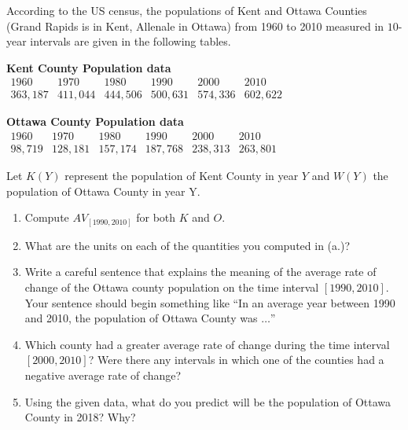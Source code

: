 \documentclass[nooutcomes]{ximera}
\begin{document}
\begin{exploration}
According to the US census, the populations of Kent and Ottawa Counties (Grand Rapids is in Kent, Allenale in Ottawa) from 1960 to 2010 measured in $10$-year intervals are given in the following tables.

\begin{center}

\textbf{Kent County Population data}
$
\begin{array}{llllll}
1960&1970&1980&1990&2000&2010\\
\hline
363,187&411,044&444,506&500,631&574,336&602,622
\end{array}
$

\vspace{.2in}

\textbf{Ottawa County Population data}
$
\begin{array}{llllll}
1960&1970&1980&1990&2000&2010\\
\hline
98,719&128,181&157,174&187,768&238,313&263,801
\end{array}
$
\end{center}

Let $K(Y)$ represent the population of Kent County in year $Y$ and $W(Y)$ the population of Ottawa County in year Y.
\begin{enumerate}[label=\alph*.]
\item Compute $AV_{[1990,2010]}$ for both $K$ and $O$.
\item What are the units on each of the quantities you computed in (a.)?
\item Write a careful sentence that explains the meaning of the average rate of change of the Ottawa county population on the time interval $[1990,2010]$.  Your sentence should begin something like ``In an average year between 1990 and 2010, the population of Ottawa County was $\ldots$''
\item Which county had a greater average rate of change during the time interval $[2000,2010]$? Were there any intervals in which one of the counties had a negative average rate of change?
\item Using the given data, what do you predict will be the population of Ottawa County in 2018? Why?
\end{enumerate}
\end{exploration}
\end{document}
